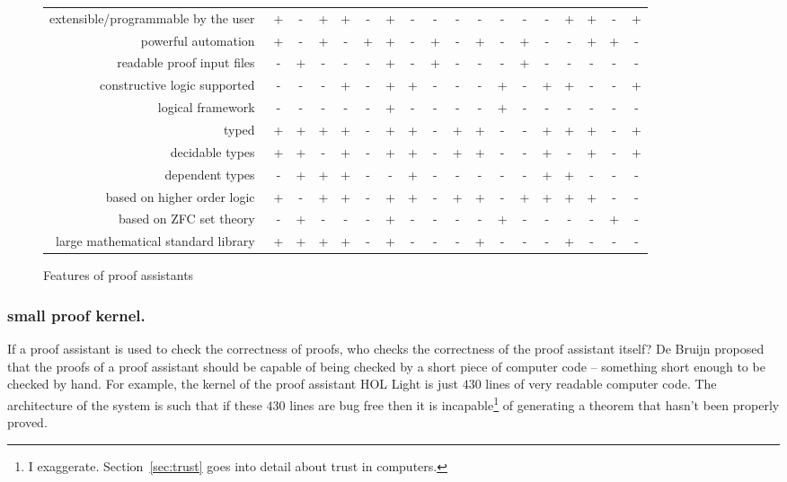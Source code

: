 \documentclass{llncs}
\newcommand{\ring}[1]{\mathbb{#1}}
\begin{document}
\begin{figure}
\begin{tabular}{|r|ccccc|ccccc|ccccc|cc|}
extensible/programmable by the user~
&+ &- &+ &+  &- &+ &- &-  &- &- &- &-  &- &+ &+ &-  &+ 
\\
powerful automation~
&+ &- &+ &-  &+ &+ &- &+  &- &+ &- &+  &- &- &+ &+  &- 
\\
readable proof input files~
&- &+ &- &-  &- &+ &- &+  &- &- &- &+  &- &- &- &-  &- 
\\
\hline
constructive logic supported~
&- &- &- &+  &- &+ &+ &-  &- &- &+ &-  &+ &+ &- &-  &+ 
\\
logical framework~
&- &- &- &-  &- &+ &- &-  &- &- &+ &-  &- &- &- &-  &- 
\\
typed~
&+ &+ &+ &+  &- &+ &+ &-  &+ &+ &- &-  &+ &+ &+ &-  &+ 
\\
decidable types~
&+ &+ &- &+  &- &+ &+ &-  &+ &+ &- &-  &+ &- &+ &-  &+ 
\\
dependent types~
&- &+ &+ &+  &- &- &+ &-  &- &- &- &-  &+ &+ &- &-  &- 
\\
\hline
based on higher order logic~
&+ &- &+ &+  &- &+ &+ &-  &+ &+ &- &+  &+ &+ &+ &-  &- 
\\
based on ZFC set theory~
&- &+ &- &-  &- &+ &- &-  &- &- &+ &-  &- &- &- &+  &- 
\\
large mathematical standard library~
&+ &+ &+ &+  &- &+ &- &-  &- &+ &- &-  &- &+ &- &-  &- 
\\
\hline
\end{tabular}
\caption{Features of proof assistants~\cite{wiedijk:17}}
\label{fig:feature}
\end{figure}
\bigskip 

\subsubsection{small proof kernel.} If a proof assistant is used to
check the correctness of proofs, who checks the correctness of the
proof assistant itself?  De Bruijn proposed that the proofs of a
proof assistant should be capable of being checked by a short piece of
computer code -- something short enough to be checked by hand.  For
example, the kernel of the proof assistant HOL Light is just $430$
lines of very readable computer code.  The architecture of the system
is such that if these $430$ lines are bug free then it is
incapable\footnote{I exaggerate. Section~\ref{sec:trust} goes into
  detail about trust in computers.} of generating a theorem that
hasn't been properly proved.
\end{document}
